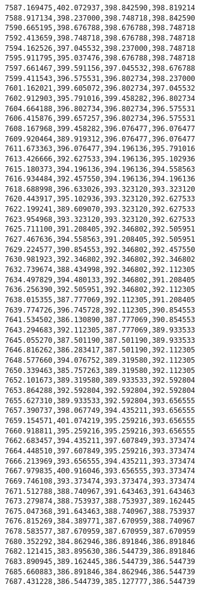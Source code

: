 \documentclass[11pt]{article}
\begin{document}
\begin{Verbatim}[commandchars=\\\{\}]
7587.169475,402.072937,398.842590,398.819214
7588.917134,398.237000,398.748718,398.842590
7590.665195,398.676788,398.676788,398.748718
7592.413659,398.748718,398.676788,398.748718
7594.162526,397.045532,398.237000,398.748718
7595.911795,395.037476,398.676788,398.748718
7597.661467,399.591156,397.045532,398.676788
7599.411543,396.575531,396.802734,398.237000
7601.162021,399.605072,396.802734,397.045532
7602.912903,395.791016,399.458282,396.802734
7604.664188,396.802734,396.802734,396.575531
7606.415876,399.657257,396.802734,396.575531
7608.167968,399.458282,396.076477,396.076477
7609.920464,389.919312,396.076477,396.076477
7611.673363,396.076477,394.196136,395.791016
7613.426666,392.627533,394.196136,395.102936
7615.180373,394.196136,394.196136,394.558563
7616.934484,392.457550,394.196136,394.196136
7618.688998,396.633026,393.323120,393.323120
7620.443917,395.102936,393.323120,392.627533
7622.199241,389.609070,393.323120,392.627533
7623.954968,393.323120,393.323120,392.627533
7625.711100,391.208405,392.346802,392.505951
7627.467636,394.558563,391.208405,392.505951
7629.224577,390.854553,392.346802,392.457550
7630.981923,392.346802,392.346802,392.346802
7632.739674,388.434998,392.346802,392.112305
7634.497829,394.480133,392.346802,391.208405
7636.256390,392.505951,392.346802,392.112305
7638.015355,387.777069,392.112305,391.208405
7639.774726,396.745728,392.112305,390.854553
7641.534502,386.130890,387.777069,390.854553
7643.294683,392.112305,387.777069,389.933533
7645.055270,387.501190,387.501190,389.933533
7646.816262,386.283417,387.501190,392.112305
7648.577660,394.076752,389.319580,392.112305
7650.339463,385.757263,389.319580,392.112305
7652.101673,389.319580,389.933533,392.592804
7653.864288,392.592804,392.592804,392.592804
7655.627310,389.933533,392.592804,393.656555
7657.390737,398.067749,394.435211,393.656555
7659.154571,401.074219,395.259216,393.656555
7660.918811,395.259216,395.259216,393.656555
7662.683457,394.435211,397.607849,393.373474
7664.448510,397.607849,395.259216,393.373474
7666.213969,393.656555,394.435211,393.373474
7667.979835,400.916046,393.656555,393.373474
7669.746108,393.373474,393.373474,393.373474
7671.512788,388.740967,391.643463,391.643463
7673.279874,388.753937,388.753937,389.162445
7675.047368,391.643463,388.740967,388.753937
7676.815269,384.389771,387.670959,388.740967
7678.583577,387.670959,387.670959,387.670959
7680.352292,384.862946,386.891846,386.891846
7682.121415,383.895630,386.544739,386.891846
7683.890945,389.162445,386.544739,386.544739
7685.660883,386.891846,384.862946,386.544739
7687.431228,386.544739,385.127777,386.544739

\end{Verbatim}
\end{document}
